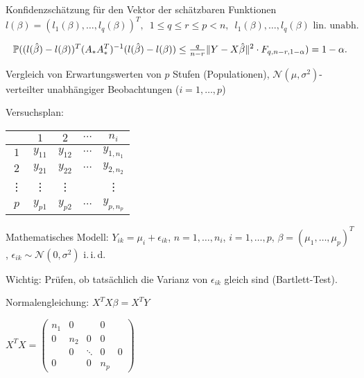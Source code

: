 \documentclass{cheat-sheet}
\renewcommand{\P}{\mathbb{P}} %
\newcommand{\iid}{i.\,i.\,d.} %
\newcommand{\Normal}{\mathcal{N}} %
\begin{document}
Konfidenzschätzung für den Vektor der schätzbaren Funktionen
\[
  l(\beta) = (l_1(\beta), \ldots, l_q(\beta))^T, \enspace
  1 \leq q \leq r \leq p < n, \enspace
  l_1(\beta), \ldots, l_q(\beta) \text{ lin. unabh.}
\]

\[
  \P((l(\hat\beta) - l(\beta))^T (A_* A_*^T)^{-1} (l(\hat\beta) - l(\beta)) \leq \tfrac{q}{n-r} \norm{Y - X \hat\beta}^2 \cdot F_{q, n - r, 1 - \alpha}) = 1 - \alpha.
\]




Vergleich von Erwartungswerten von $p$ Stufen (Populationen), $\Normal(\mu, \sigma^2)$-verteilter unabhängiger Beobachtungen ($i = 1, \ldots, p$)

Versuchsplan:

\begin{center}
  \renewcommand{\arraystretch}{1.5}
  \begin{tabular}{c | c c c c}
    & $1$ & $2$ & $\cdots$ & $n_i$ \\ \hline
    $1$ & $y_{11}$ & $y_{12}$ & $\cdots$ & $y_{1,n_1}$ \\
    $2$ & $y_{21}$ & $y_{22}$ & $\cdots$ & $y_{2,n_2}$ \\
    \vdots & \vdots & \vdots & & \vdots \\
    $p$ & $y_{p1}$ & $y_{p2}$ & $\cdots$ & $y_{p,n_p}$ \\
  \end{tabular}
\end{center}

Mathematisches Modell: $Y_{ik} = \mu_i + \epsilon_{ik}$, $n = 1, \ldots, n_i$, $i = 1, \ldots, p$, $\beta = (\mu_1, \ldots, \mu_p)^T$, $\epsilon_{ik} \sim \Normal(0, \sigma^2)$ \iid{}


Wichtig: Prüfen, ob tatsächlich die Varianz von $\epsilon_{ik}$ gleich sind (Bartlett-Test).

Normalengleichung: $X^T X \beta = X^T Y$

$X^T X = \begin{pmatrix}
  n_1 & 0 & & 0 \\
  0 & n_2 & 0 & 0 \\
  & 0 & \ddots & 0 & 0 \\
  0 & & 0 & n_p
\end{pmatrix}$
\end{document}
